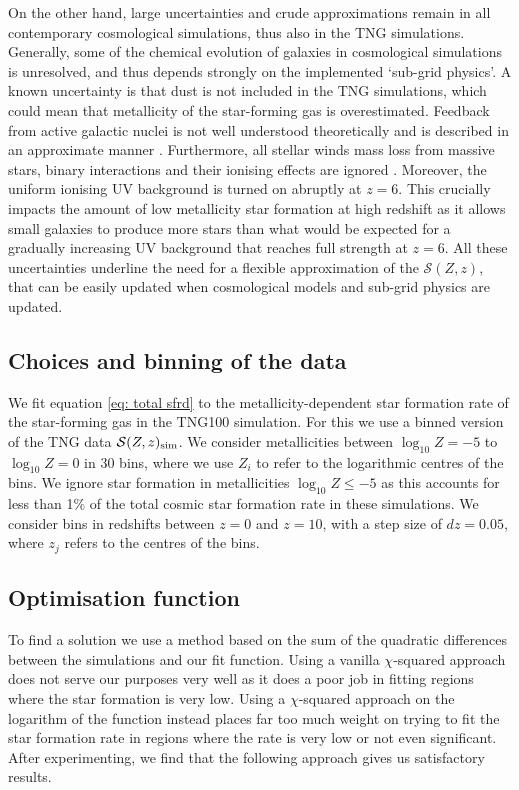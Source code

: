 \documentclass[twocolumn]{aastex631}
\newcommand{\SFRDzZ}{\ensuremath{\mathcal{S}(Z,z)}\xspace}
\begin{document}
On the other hand, large uncertainties and crude approximations remain in all contemporary cosmological simulations, thus also in the TNG simulations. 
Generally, some of the chemical evolution of galaxies in cosmological simulations is unresolved, and thus depends strongly on the implemented `sub-grid physics'.
A known uncertainty is that dust is not included in the TNG simulations, which could mean that metallicity of the star-forming gas is overestimated. 
Feedback from active galactic nuclei is not well understood theoretically and is described in an approximate manner \citep{Springel2005, Weinberger2017}.  Furthermore, all stellar winds mass loss from massive stars, binary interactions and their ionising effects are ignored \citep[e.g.][]{Dray+2003,Smith2014,Gotberg+2020,DoughtyFinlator2021,Farmer2021_carbonfootprint,Goswami+2022}.
Moreover, the uniform ionising UV background is turned on abruptly at $z=6$. This crucially impacts the amount of low metallicity star formation at high redshift as it allows small galaxies to produce more stars than what would be expected for a gradually increasing UV background that reaches full strength at $z=6$.
%
All these uncertainties underline the need for a flexible approximation of the \SFRDzZ, that can be easily updated when cosmological models and sub-grid physics are updated. 




\subsection{Choices and binning of the data}
We fit equation \ref{eq: total sfrd} to the metallicity-dependent star formation rate of the star-forming gas in the TNG100 simulation. For this we use a binned version of the TNG data $\SFRDzZ_{\rm sim}$. We consider metallicities between $\log_{10} Z= -5$ to $\log_{10} Z= 0$ in 30 bins, where we use $Z_i$ to refer to the logarithmic centres of the bins. We ignore star formation in metallicities $\log_{10} Z \le -5$ as this accounts for less than 1\% of the total cosmic star formation rate in these simulations.
We consider bins in redshifts between $z=0$ and $z=10$, with a step size of $dz=0.05$, where $z_j$ refers to the centres of the bins. 

\subsection{Optimisation function}
To find a solution we use a method based on the sum of the quadratic differences between the simulations and our fit function. Using a vanilla $\chi$-squared approach does not serve our purposes very well as it does a poor job in fitting regions where the star formation is very low.  Using a $\chi$-squared approach on the logarithm of the function instead places far too much weight on trying to fit the star formation rate in regions where the rate is very low or not even significant.  After experimenting, we find that the following approach gives us satisfactory results. 
\end{document}
